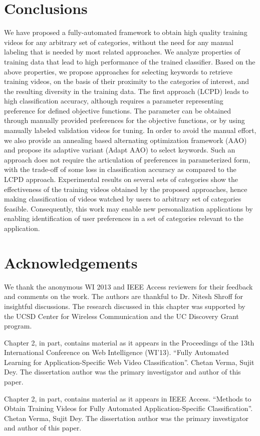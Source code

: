 \section{Conclusions}
\label{sec:conclusion}

We have proposed a fully-automated framework to obtain high quality training videos for any arbitrary set of categories, without the need for any manual labeling that is needed by most related approaches. We analyze properties of training data that lead to high performance of the trained classifier. Based on the above properties, we propose approaches for selecting keywords to retrieve training videos, on the basis of their proximity to the categories of interest, and the resulting diversity in the training data. The first approach (LCPD) leads to high classification accuracy, although requires a parameter representing preference for defined objective functions. The parameter can be obtained through manually provided preferences for the objective functions, or by using manually labeled validation videos for tuning. In order to avoid the manual effort, we also provide an annealing based alternating optimization framework (AAO) and propose its adaptive variant (Adapt AAO) to select keywords. Such an approach does not require the articulation of preferences in parameterized form, with the trade-off of some loss in classification accuracy as compared to the LCPD approach. Experimental results on several sets of categories show the effectiveness of the training videos obtained by the proposed approaches, hence making classification of videos watched by users to arbitrary set of categories feasible. Consequently, this work may enable new personalization applications by enabling identification of user preferences in a set of categories relevant to the application.

\section{Acknowledgements} 

We thank the anonymous WI 2013 and IEEE Access reviewers for their feedback and comments on the work. The authors are thankful to Dr. Nitesh Shroff for insightful discussions. The research discussed in this chapter was supported by the UCSD Center for Wireless Communication and the UC Discovery Grant program. 

Chapter 2, in part, contains material as it appears in the Proceedings of the 13th International Conference on Web Intelligence (WI'13). ``Fully Automated Learning for Application-Specific Web Video Classification''. Chetan Verma, Sujit Dey. The dissertation author was the primary investigator and author of this paper. 

Chapter 2, in part, contains material as it appears in IEEE Access. ``Methods to Obtain Training Videos for Fully Automated Application-Specific Classification''. Chetan Verma, Sujit Dey. The dissertation author was the primary investigator and author of this paper. 
